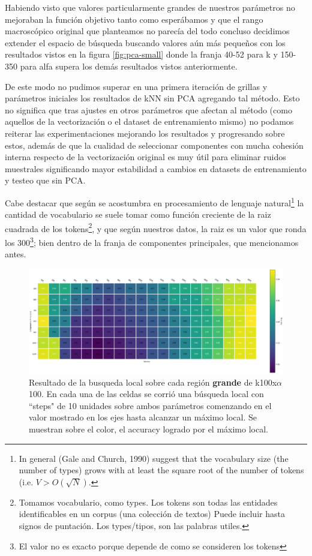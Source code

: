 Habiendo visto que valores particularmente grandes de nuestros parámetros no mejoraban la función objetivo tanto como esperábamos y que el rango macroscópico original que planteamos no parecía del todo concluso decidimos extender el espacio de búsqueda buscando valores aún más pequeños con los resultados vistos en la figura \ref{fig:pca-small} donde la franja 40-52 para k y 150-350 para alfa supera los demás resultados vistos anteriormente.

De este modo no pudimos superar en una primera iteración de grillas y parámetros iniciales los resultados de kNN sin PCA agregando tal método. Esto no significa que tras ajustes en otros parámetros que afectan al método (como aquellos de la vectorización o el dataset de entrenamiento mismo) no podamos reiterar las experimentaciones mejorando los resultados y progresando sobre estos, además de que la cualidad de seleccionar componentes con mucha cohesión interna respecto de la vectorización original es muy útil para eliminar ruidos muestrales significando mayor estabilidad a cambios en datasets de entrenamiento y testeo que sin PCA.

Cabe destacar que según se acostumbra en procesamiento de
lenguaje\cite{LP} natural\footnote{In general (Gale and Church, 1990)
  suggest that the vocabulary size (the number of types) grows with at
  least the square root of the number of tokens (i.e.
  $V > O(\sqrt{N})$.} la cantidad de vocabulario se suele tomar como
función creciente de la raiz cuadrada de los tokens\footnote{Tomamos
  vocabulario, como types. Los tokens son todas las entidades
  identificables en un corpus (una colección de textos) Puede incluir
  hasta signos de puntación. Los types/tipos, son las palabras
  utiles.}, y que según nuestros datos, la raiz es un valor que ronda
los 300\footnote{El valor no es exacto porque depende de como se
  consideren los tokens}; bien dentro de la franja de componentes
principales, que mencionamos antes.

\begin{figure}[h]
  \includegraphics[width=1.05\textwidth]{./img/pca_big_grid.png}
  \centering
  \caption{Resultado de la busqueda local sobre cada región
    \textbf{grande} de k100x$\alpha$100. En cada una de las celdas se corrió una búsqueda local con ``steps" de 10 unidades sobre ambos parámetros comenzando en el valor mostrado en los ejes hasta alcanzar un
    máximo local. Se muestran sobre el color, el accuracy logrado por el máximo local.}
  \label{fig:pca-big}
\end{figure}


